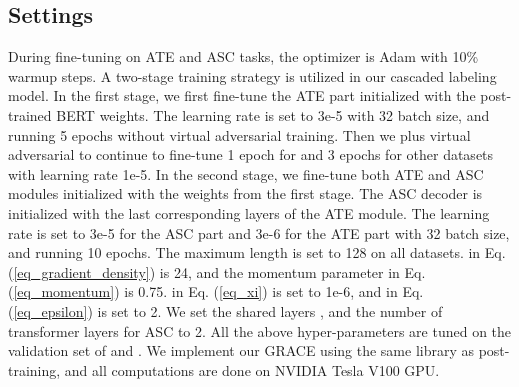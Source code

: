 \documentclass[11pt,a4paper]{article}
\begin{document}
\subsection{Settings}
During fine-tuning on ATE and ASC tasks, the optimizer is Adam with 10\% warmup steps. A two-stage training strategy is utilized in our cascaded labeling model. In the first stage, we first fine-tune the ATE part initialized with the post-trained BERT weights. The learning rate is set to 3e-5 with 32 batch size, and running 5 epochs without virtual adversarial training. Then we plus virtual adversarial to continue to fine-tune 1 epoch for  and 3 epochs for other datasets with learning rate 1e-5. In the second stage, we fine-tune both ATE and ASC modules initialized with the weights from the first stage. The ASC decoder is initialized with the last corresponding layers of the ATE module. The learning rate is set to 3e-5 for the ASC part and 3e-6 for the ATE part with 32 batch size, and running 10 epochs. The maximum length is set to 128 on all datasets.  in Eq. (\ref{eq_gradient_density}) is 24, and the momentum parameter  in Eq. (\ref{eq_momentum}) is 0.75.  in Eq. (\ref{eq_xi}) is set to 1e-6, and  in Eq. (\ref{eq_epsilon}) is set to 2. We set the shared layers , and the number of transformer layers for ASC to 2. All the above hyper-parameters are tuned on the validation set of  and . We implement our GRACE using the same library as post-training, and all computations are done on NVIDIA Tesla V100 GPU.
\end{document}
